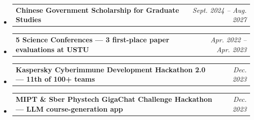 \documentclass[10.5pt,letterpaper]{article}
\makeatletter
\newcommand{\headerrow}[2]
{\begin{tabular*}{\linewidth}{l@{\extracolsep{\fill}}r}
#1 & #2 \\
\end{tabular*}}
\makeatother
\begin{document}
\begin{itemize}[leftmargin=0em, itemsep=0.25em]
    \renewcommand\labelitemi{}
    \item \headerrow{\textbf{Chinese Government Scholarship for Graduate Studies}}{\emph{Sept. 2024 -- Aug. 2027}}
    \item \headerrow{\textbf{5 Science Conferences --- 3 first-place paper evaluations at USTU}}{\emph{Apr. 2022 -- Apr. 2023}}
    \item \headerrow{\textbf{Kaspersky Cyberimmune Development Hackathon 2.0 --- 11th of 100+ teams}}{\emph{Dec. 2023}}
    \item \headerrow{\textbf{MIPT \& Sber Phystech GigaChat Challenge Hackathon --- LLM course-generation app}}{\emph{Dec. 2023}}
\end{itemize}
\end{document}
